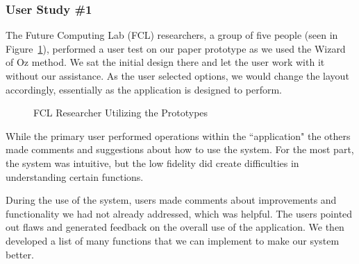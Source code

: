 \documentclass{tei2013}
\begin{document}
\subsubsection{User Study \#1}
The Future Computing Lab (FCL) researchers, a group of five people (seen in Figure~\ref{fig:user1}), performed a user test on our paper prototype as we used the Wizard of Oz method. We sat the initial design there and let the user work with it without our assistance. As the user selected options, we would change the layout accordingly, essentially as the application is designed to perform. 
\begin{figure}[ht]
\centering
{}
\caption{FCL Researcher Utilizing the Prototypes}
\label{fig:user1}
\end{figure}

While the primary user performed operations within the ``application" the others made comments and suggestions about how to use the system. For the most part, the system was intuitive, but the low fidelity did create difficulties in understanding certain functions. 

During the use of the system, users made comments about improvements and functionality we had not already addressed, which was helpful. The users pointed out flaws and generated feedback on the overall use of the application. We then developed a list of many functions that we can implement to make our system better. 
\end{document}
